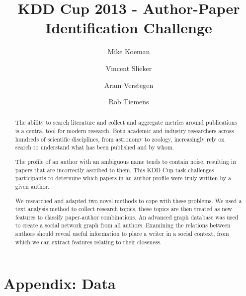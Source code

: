 \documentclass[10pt,a4paper]{article}
\title{KDD Cup 2013 - Author-Paper Identification Challenge}
\author{ Mike Koeman \and Vincent Slieker   \and Aram Verstegen \and Rob Tiemens}
\begin{document}
\maketitle


\begin{abstract}
The ability to search literature and collect and aggregate metrics around publications is a central tool for modern research. Both academic and industry researchers across hundreds of scientific disciplines, from astronomy to zoology, increasingly rely on search to understand what has been published and by whom.

The profile of an author with an ambiguous name tends to contain noise, resulting in papers that are incorrectly ascribed to them. This KDD Cup task challenges participants to determine which papers in an author profile were truly written by a given author.

We researched and adapted two novel methods to cope with these problems. We used a text analysis method to collect research topics, these topics are then treated as new features to classify paper-author combinations. An advanced graph database was used to create a social network graph from all authors. Examining the relations between authors should reveal useful information to place a writer in a social context, from which we can extract features relating to their closeness.
\end{abstract}

\nocite{chowdhury2010introduction}
\nocite{liu2005co}
\nocite{glanzel2005analysing}
\nocite{morel2009co}
\nocite{niels2008writer}
\nocite{steyvers2004probabilistic}
\nocite{newman2004coauthorship}
\nocite{Liu:2006:WDM:1215470}
\nocite{Witten:2005:DMP:1205860}












\appendix
\section{Appendix: Data  \label{sec:data-background}}




\end{document}
